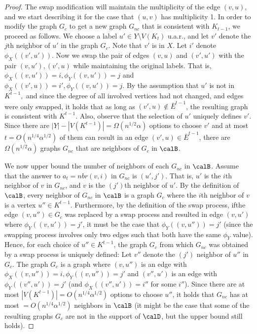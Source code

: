 \begin{proof}
    The swap modification will maintain the multiplicity of the edge $(v,u)$, and we start describing it for  the case that $(u,v)$ has multiplicity 1.  In order to modify the graph $G_c$ to get a new graph $G_{nc}$ that is consistent with $K_{t-1}$, we proceed as follows.
    We choose a label  $u'\in Y\setminus V(K_t)$ u.a.r., and let $v'$ denote the $j$th neighbor of $u'$ in the graph $G_{c}$. Note that $v'$ is in $X$. Let $i'$ denote $\phi_X((v',u'))$. Now we swap the pair of  edges $(v,u)$
    and $(v',u')$   with the pair  $(v,u'), (v',u)$  while maintaining the original labels. That is, $\phi_X((v,u'))=i, \phi_Y((v,u'))=j$ and $\phi_X((v',u))=i', \phi_Y((v,u'))=j$.
    By the assumption that $u'$ is not in $K^{t-1},$
    and since the degree of all involved vertices had not changed, and edges were only swapped,
    it holds that as long as $(v',u)\notin \bar{E}^{t-1}$, the resulting  graph is consistent with $K^{t-1}$.
    Also, observe that the selection of $u'$ uniquely defines $v'$.
    Since there are $|Y|-|V(K^{t-1})|=\Omega(n^{1/2}\alpha)$ options to choose $v'$ and at most $t=O(n^{1/4}\alpha^{1/2})$ of them can result in an edge $(v',u)\in  \bar{E}^{t-1}$, there are $\Omega(n^{1/2}\alpha)$ graphs $G_{nc}$ that are neighbors of $G_{c}$ in $\calB$.

    We now upper bound the number of neighbors of each $G_{nc}$ in $\calB$.
    Assume that the answer to $a_t=nbr(v,i)$ in $G_{nc}$ is $(u',j')$. That is, $u'$ is the $i$th neighbor of $v$ in $G_{nc}$, and $v$ is the $(j')$th neighbor of $u'$.
      By the definition of $\calB$, every neighbor of $G_{nc}$ in $\calB$ is a graph $G_{c}$ where the $i$th neighbor of $v$ is a vertex $u''\in K^{t-1}$. Furthermore, by the definition of the swap process, ifthe edge $(v,u'')\in G_c$ was replaced by a swap process and resulted in edge $(v,u')$ where $\phi_Y((v,u'))=j'$, it must be the case that $\phi_{Y}((v,u''))=j'$ (since the swapping process  involves only two edges such that both have the same $\phi_Y$ value). Hence, for each choice of $u''\in K^{t-1}$, the graph $G_c$ from which $G_{nc}$ was obtained by a swap process is uniquely defined:
      Let $v''$ denote the $(j')$ neighbor of $u''$ in $G_c$.
      The graph $G_c$ is a graph where
      $(v,u'')$ is an edge with $\phi_{X}((v,u''))=i, \phi_Y((v,u''))=j'$ and $(v'', u')$ is an edge with $\phi_Y((v'', u'))=j'$ (and $\phi_X((v'', u'))=i''$ for some $i''$). Since there are at most $|V(K^{t-1})|=O(n^{1/4}\alpha^{1/2})$ options to choose $u''$, it holds that $G_{nc}$ has at most $=O(n^{1/4}\alpha^{1/2})$ neighbors in $\calB$ (it might be the case that some of the resulting graphs $G_c$ are not in the support of $\calD$, but the upper bound still holds).


\end{proof}
